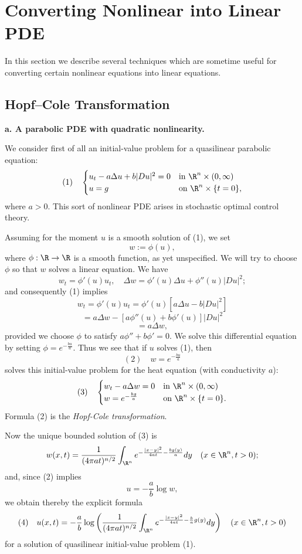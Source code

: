\section{Converting Nonlinear into Linear PDE}
\label{sec:converting-nonlinear-into-linear-pde}

In this section we describe several techniques which are sometime useful for converting certain nonlinear equations into linear equations.

\subsection{Hopf--Cole Transformation}
\label{sec:hopf-cole-transformation}

\textbf{a. A parabolic PDE with quadratic nonlinearity.}

\begin{example}
\label{ex:hopf-cole-quadratic-nonlinearity}
We consider first of all an initial-value problem for a quasilinear parabolic equation:
$$(1) \quad \begin{cases}
u_t - a\Delta u + b|Du|^2 = 0 & \text{in } \R^n \times (0, \infty) \\
u = g & \text{on } \R^n \times \{t = 0\},
\end{cases}$$
where $a > 0$. This sort of nonlinear PDE arises in stochastic optimal control theory.

Assuming for the moment $u$ is a smooth solution of (1), we set
$$w := \phi(u),$$
where $\phi : \R \to \R$ is a smooth function, as yet unspecified. We will try to choose $\phi$ so that $w$ solves a linear equation. We have
$$w_t = \phi'(u)u_t, \quad \Delta w = \phi'(u)\Delta u + \phi''(u)|Du|^2;$$
and consequently (1) implies
$$w_t = \phi'(u)u_t = \phi'(u)[a\Delta u - b|Du|^2]$$
$$= a\Delta w - [a\phi''(u) + b\phi'(u)]|Du|^2$$
$$= a\Delta w,$$
provided we choose $\phi$ to satisfy $a\phi'' + b\phi' = 0$. We solve this differential equation by setting $\phi = e^{-\frac{bu}{a}}$. Thus we see that if $u$ solves (1), then
$$(2) \quad w = e^{-\frac{bu}{a}}$$
solves this initial-value problem for the heat equation (with conductivity $a$):
$$(3) \quad \begin{cases} w_t - a \Delta w = 0 & \text{in } \R^n \times (0, \infty) \\ w = e^{-\frac{bg}{a}} & \text{on } \R^n \times \{t = 0\}. \end{cases}$$
Formula (2) is the \textit{Hopf-Cole transformation}.

Now the unique bounded solution of (3) is
$$w(x,t) = \frac{1}{(4\pi at)^{n/2}} \int_{\R^n} e^{-\frac{|x-y|^2}{4at} - \frac{bg(y)}{a}} dy \quad (x \in \R^n, t > 0);$$
and, since (2) implies
$$u = -\frac{a}{b} \log w,$$
we obtain thereby the explicit formula
$$(4) \quad u(x,t) = -\frac{a}{b} \log \left( \frac{1}{(4\pi at)^{n/2}} \int_{\R^n} e^{-\frac{|x-y|^2}{4at} - \frac{b}{a}g(y)} dy \right) \quad (x \in \R^n, t > 0)$$
for a solution of quasilinear initial-value problem (1).
\end{example}

